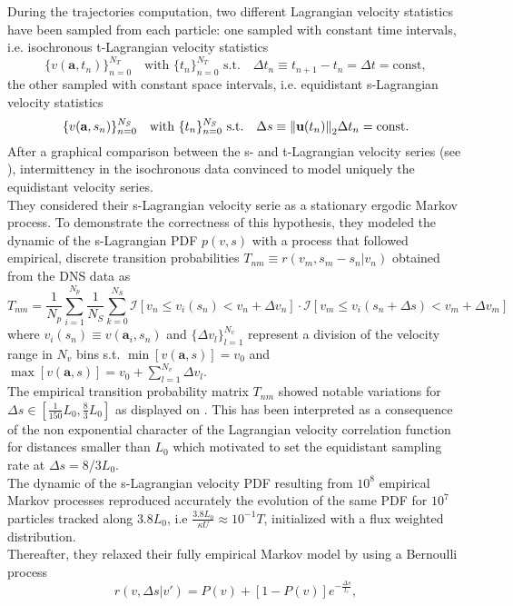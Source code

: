 During the trajectories computation, two different Lagrangian velocity statistics have been sampled from each particle: one sampled with constant time intervals, i.e. isochronous t-Lagrangian velocity statistics
\[
\{v(\textbf{a},t_{n})\}_{n=0}^{N_T}\quad\textrm{with $\{t_n\}_{n=0}^{N_T}$ s.t.}\quad \Delta t_n\equiv t_{n+1}-t_n = \Delta t=\mathrm{const},
\] 
the other sampled with constant space intervals, i.e. equidistant s-Lagrangian velocity statistics
\[\{v(\textbf{a},s_{n})\}_{n=0}^{N_S}\quad\textrm{with $\{t_n\}_{n=0}^{N_S}$ s.t.}\quad \Delta s \equiv\norm{\textbf{u}(t_n)}_2\Delta t_n = \mathrm{const}.
\]
After a graphical comparison between the s- and t-Lagrangian velocity series (see \citet[Fig. 2]{Puyguiraud2019}), intermittency in the isochronous data convinced \citeauthor{Puyguiraud2019} to model uniquely the equidistant velocity series.\\
They considered their s-Lagrangian velocity serie as a stationary ergodic Markov process. 
To demonstrate the correctness of this hypothesis, they modeled the dynamic of the s-Lagrangian PDF $p(v,s)$ with a process that followed empirical, discrete transition probabilities $T_{nm}\equiv r(v_m,s_m-s_n|v_n)$ obtained from the DNS data as
\[
T_{nm}=\frac{1}{N_p}\sum_{i=1}^{N_p}\frac{1}{N_S}\sum_{k=0}^{N_S}\mathcal{I}[v_n \leq v_i(s_n) < v_n + \Delta v_n]\cdot\mathcal{I}[v_m \leq v_i(s_n+\Delta s) < v_m + \Delta v_m]
\]
where $v_i(s_n)\equiv v(\textbf{a}_i,s_n)$ and $\{\Delta v_l\}_{l=1}^{N_v}$ represent a division of the velocity range in $N_v$ bins s.t. $\min[v(\textbf{a},s)]=v_0$ and $\max[v(\textbf{a},s)]=v_{0}+\sum_{l=1}^{N_v}\Delta v_l$.\\
The empirical transition probability matrix $T_{nm}$ showed notable variations for $\Delta s\in[\frac{1}{150}L_0,\frac{8}{3}L_0]$ as displayed on \citet[Fig. 7]{Puyguiraud2019}. 
This has been interpreted as a consequence of the non exponential character of the Lagrangian velocity correlation function for distances smaller than $L_0$ which motivated \citeauthor{Puyguiraud2019} to set the equidistant sampling rate at $\Delta s = 8/3 L_0$.\\
The dynamic of the s-Lagrangian velocity PDF resulting from $10^8$ empirical Markov processes reproduced accurately the evolution of the same PDF for $10^7$ particles tracked along $3.8L_0$, i.e $\frac{3.8L_0}{\kappa U}\approx 10^{-1}T$, initialized with a flux weighted distribution.\\
Thereafter, they relaxed their fully empirical Markov model by using a Bernoulli process 
\begin{equation}\label{eq:bernoulli}
r(v,\Delta s|v')=P(v) + [1 - P(v)] e^{-\frac{\Delta s}{l_c}},
\end{equation}
